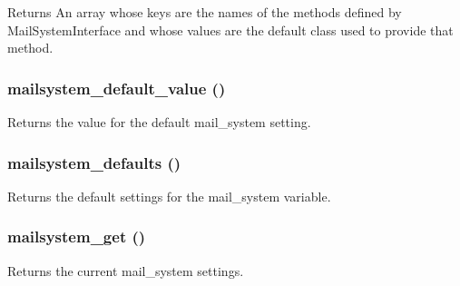 \begin{DoxyReturn}{Returns}
An array whose keys are the names of the methods defined by MailSystemInterface and whose values are the default class used to provide that method. 
\end{DoxyReturn}
\hypertarget{mailsystem_8module_ac6dcd069efd821e73a67945b2f18e525}{
\subsubsection[{mailsystem\_\-default\_\-value}]{\setlength{\rightskip}{0pt plus 5cm}mailsystem\_\-default\_\-value ()}}
\label{mailsystem_8module_ac6dcd069efd821e73a67945b2f18e525}
Returns the value for the default mail\_\-system setting. \hypertarget{mailsystem_8module_a167ec538a63c35ea94941d5413ad18eb}{
\subsubsection[{mailsystem\_\-defaults}]{\setlength{\rightskip}{0pt plus 5cm}mailsystem\_\-defaults ()}}
\label{mailsystem_8module_a167ec538a63c35ea94941d5413ad18eb}
Returns the default settings for the mail\_\-system variable. \hypertarget{mailsystem_8module_af474b2a7b012502b3899c3e6c6780e92}{
\subsubsection[{mailsystem\_\-get}]{\setlength{\rightskip}{0pt plus 5cm}mailsystem\_\-get ()}}
\label{mailsystem_8module_af474b2a7b012502b3899c3e6c6780e92}
Returns the current mail\_\-system settings.

